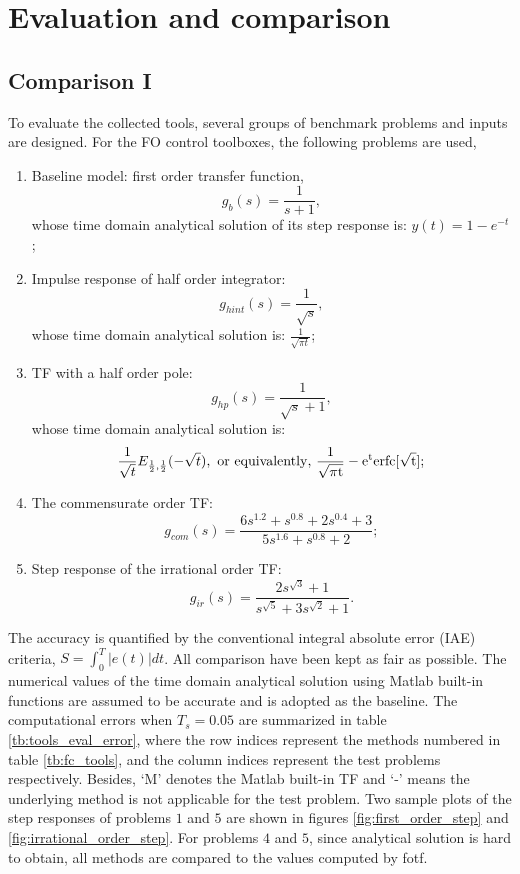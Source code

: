 \documentclass[11pt]{tCON2e}
\theoremstyle{plain}\newtheorem{theorem}{Theorem}
\theoremstyle{definition}
\theoremstyle{remark}
\begin{document}
\section{Evaluation and comparison}
\label{sec:evaluation}
\subsection{Comparison I}
To evaluate the collected tools, several groups of benchmark problems and inputs are designed. For the FO control toolboxes, the following problems are used,
\begin{enumerate}
    \item Baseline model: first order transfer function,  $$ g_{b}(s) = \frac{1}{s+1},$$
    whose time domain analytical solution of its step response is: $y(t) = 1- e^{-t}$;
    \item Impulse response of half order integrator: $$ g_{hint}(s) = \frac{1}{\sqrt{s}},$$
    whose time domain analytical solution is: $\frac{1}{\sqrt{\pi t}}$;
    \item TF with a half order pole: $$ g_{hp}(s) = \frac{1}{\sqrt{s}+1},$$
    whose time domain analytical solution is: $$\frac{1}{\sqrt{t}}E_{\frac{1}{2},\frac{1}{2}}(-\sqrt{t}), \ \rm{or \ equivalently,} \ \frac{1}{\sqrt{\pi t}}-e^{t} erfc [\sqrt{t}];$$
    \item The commensurate order TF: $$ g_{com}(s) = \frac{6s^{1.2}+s^{0.8}+2s^{0.4}+3}{5s^{1.6}+s^{0.8}+2};$$
    \item Step response of the irrational order TF: $$ g_{ir}(s) = \frac{2s^{\sqrt{3}}+1}{s^{\sqrt{5}}+3s^{\sqrt{2}}+1}.$$
\end{enumerate}





The accuracy is quantified by the conventional integral absolute error (IAE) criteria, $S = \int_{0}^{T}|e(t)|dt$. All comparison have been kept as fair as possible. The numerical values of the time domain analytical solution using Matlab built-in functions are assumed to be accurate and is adopted as the baseline. The computational errors when $T_s=0.05$ are summarized in table \ref{tb:tools_eval_error},
where the row indices represent the methods numbered in table \ref{tb:fc_tools}, and the column indices represent the test problems respectively. Besides, `M' denotes the Matlab built-in TF and `-' means the underlying method is not applicable for the test problem. Two sample plots of the step responses of problems $1$ and $5$ are shown in figures \ref{fig:first_order_step} and \ref{fig:irrational_order_step}. For problems $4$ and $5$, since analytical solution is hard to obtain, all methods are compared to the values computed by fotf.
\end{document}

